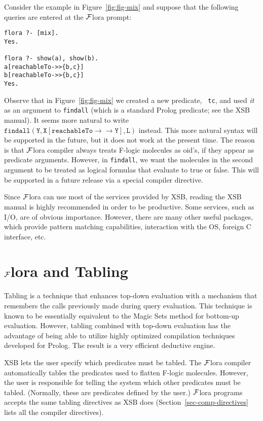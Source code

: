 \documentclass[11pt]{article}
\newcommand{\mvd}{\ensuremath{{\rightarrow\!\!\!\!\rightarrow}}}  %
\newcommand{\FLORA}{{\mbox{${\cal F}${\sc lora}}}\xspace}
\newcommand{\fl}{{F-logic}\xspace}
\begin{document}
Consider the example in Figure~\ref{fig:fig-mix} and suppose that the
following queries are entered at the \FLORA prompt:
\begin{verbatim}
flora ?- [mix].
Yes.

flora ?- show(a), show(b).
a[reachableTo->>{b,c}]
b[reachableTo->>{b,c}]
Yes.
\end{verbatim}

Observe that in Figure~\ref{fig:fig-mix} we created a new predicate, {\tt
  tc}, and used \emph{it} as an argument to {\tt findall} (which is a
standard Prolog predicate; see the XSB manual). It seems more natural to
write $\mathtt{findall(Y,X[reachableTo{\mvd}Y],L)}$ instead.  This more
natural syntax will be supported in the future, but it does not work at the
present time. The reason is that \FLORA compiler always treats \fl
molecules as oid's, if they appear as predicate arguments.  However, in
{\tt findall}, we want the molecules in the second argument to be treated
as logical formulas that evaluate to true or false.  This will be supported
in a future release via a special compiler directive.

Since \FLORA can use most of the services provided by XSB, reading the XSB
manual is highly recommended in order to be productive. Some services, such
as I/O, are of obvious importance. However, there are many other useful
packages, which provide pattern matching capabilities, interaction with the
OS, foreign C interface, etc.

\section{\FLORA and Tabling}\label{sec-tabling-flora}

Tabling is a technique that enhances top-down evaluation with a mechanism
that remembers the calls previously made during query evaluation.
This technique is known to be essentially equivalent to the Magic Sets
method for bottom-up evaluation. However, tabling combined with top-down
evaluation has the advantage of being able to utilize highly optimized
compilation techniques developed for Prolog. The result is a very efficient
deductive engine.

XSB lets the user specify which predicates must be tabled.  The \FLORA
compiler automatically tables the predicates used to flatten \fl molecules.
However, the user is responsible for telling the system which other
predicates must be tabled. (Normally, these are predicates defined by the
user.)  \FLORA programs accepts the same tabling directives as XSB does
(Section~\ref{sec-comp-directives} lists all the compiler directives).
\end{document}
